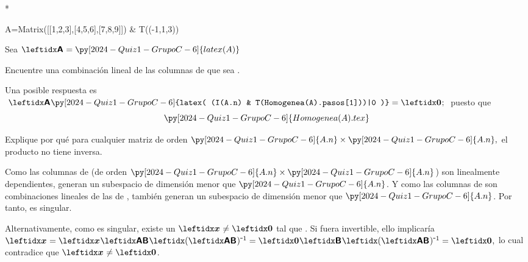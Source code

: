 \begin{exercise}*
  
  \begin{pycode}
A=Matrix([[1,2,3],[4,5,6],[7,8,9]]) & T((-1,1,3))
  \end{pycode}
  
  Sea
  \begin{math}
    \Mat{A}= \py[2024-Quiz1-GrupoC-6]{latex(A)}
  \end{math}
  
  \begin{parts}
    
  \item {} Encuentre una combinación lineal de las columnas de  que sea .
    \begin{solution}[]
      Una posible respuesta es
      \begin{math}
        \;\Mat{A}\py[2024-Quiz1-GrupoC-6]{latex( (I(A.n) & T(Homogenea(A).pasos[1]))|0 )}=\Vect{0};\;
      \end{math}
      puesto que
      \begin{displaymath}
        \py[2024-Quiz1-GrupoC-6]{Homogenea(A).tex}
      \end{displaymath}
    \end{solution}
    
  \item {} Explique por qué para cualquier matriz  de orden
    \begin{math}
      \py[2024-Quiz1-GrupoC-6]{A.n}\times\py[2024-Quiz1-GrupoC-6]{A.n},
    \end{math}
    el producto  no tiene inversa.
    \begin{solution}[]
      Como las columnas de 
      (de orden $\py[2024-Quiz1-GrupoC-6]{A.n}\times\py[2024-Quiz1-GrupoC-6]{A.n}$)
      son linealmente dependientes,
      generan un subespacio de dimensión menor que $\py[2024-Quiz1-GrupoC-6]{A.n}$.
      Y como las columnas de  son combinaciones lineales de las de ,
      también generan un subespacio de dimensión menor que $\py[2024-Quiz1-GrupoC-6]{A.n}$.
      Por tanto,  es singular.
      
      Alternativamente, como  es singular, existe un $\Vect{x}\ne\Vect{0}$ tal que . Si  fuera invertible, ello implicaría
      \begin{math}
        \Vect{x} = \VM{x}{AB}\InvMatp*{AB} =
        \Vect{0}\Mat{B}\InvMatp*{AB} = \Vect{0},
      \end{math}
      lo cual contradice que $\Vect{x} \ne \Vect{0}$.
    \end{solution}
  \end{parts}
\end{exercise}

